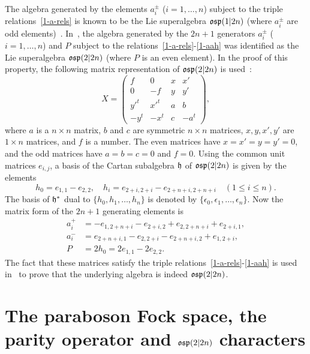 \documentclass{SciPost}
\begin{document}
The algebra generated by the elements $a_i^\pm$ ($i=1,\ldots,n$) subject to the triple relations~\eqref{1-a-rels} 
is known to be the Lie superalgebra $\mathfrak{osp}(1|2n)$ (where $a_i^\pm$ are odd elements)~\cite{Ganchev}.
In~\cite{SV2026}, the algebra generated by the $2n+1$ generators $a_i^\pm$ ($i=1,\ldots,n$) and $P$ subject to the relations~\eqref{1-a-rels}-\eqref{1-aah} 
was identified as the Lie superalgebra $\mathfrak{osp}(2|2n)$ (where $P$ is an even element).
In the proof of this property, the following matrix representation of $\mathfrak{osp}(2|2n)$ is used~\cite{Kac}:
\begin{equation}
X=\left( \begin{array}{cccc} f & 0 & x & x' \\ 0 & -f & y & y' \\ {y'}^t & {x'}^t & a & b \\ -{y}^t & -x^t & c & -a^t \end{array} \right),
\end{equation}
where $a$ is a $n\times n$ matrix, $b$ and $c$ are symmetric $n\times n$ matrices, $x,y,x',y'$ are $1\times n$ matrices, and $f$ is a number.
The even matrices have $x=x'=y=y'=0$, and the odd matrices have $a=b=c=0$ and $f=0$.
Using the common unit matrices $e_{i,j}$, a basis of the Cartan subalgebra $\mathfrak{h}$ of $\mathfrak{osp}(2|2n)$ is given by the elements
\begin{equation}
h_{0}=e_{1,1}-e_{2,2}, \quad h_i=e_{2+i,2+i}-e_{2+n+i,2+n+i}\quad (1\leq i\leq n).
\end{equation}
The basis of $\mathfrak{h}^*$ dual to $\{h_0, h_1, \ldots, h_{n}\}$ is denoted by $\{\epsilon_0,\epsilon_1,\ldots,\epsilon_{n}\}$.
Now the matrix form of the $2n+1$ generating elements is
\begin{align}
a_i^+ &= -e_{1,2+n+i}-e_{2+i,2}+e_{2,2+n+i}+e_{2+i,1}, \nonumber\\
a_i^- &=  e_{2+n+i,1}-e_{2,2+i}-e_{2+n+i,2}+e_{1,2+i}, \\
P &= 2h_0 = 2 e_{1,1}-2 e_{2,2}. \nonumber
\end{align}
The fact that these matrices satisfy the triple relations~\eqref{1-a-rels}-\eqref{1-aah} is used in~\cite{SV2026} to prove that the underlying algebra is indeed $\mathfrak{osp}(2|2n)$.

\setcounter{equation}{0}
\section{The paraboson Fock space, the parity operator and $\mathfrak{osp}(2|2n)$ characters}
\label{sec6}
\end{document}
